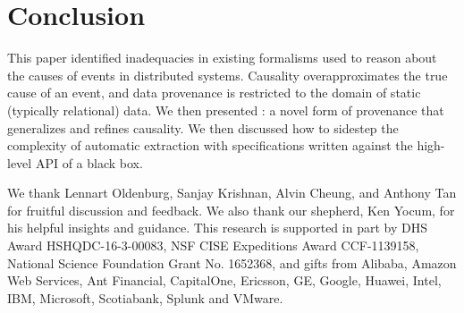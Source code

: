 \section{Conclusion}
This paper identified inadequacies in existing formalisms used to reason about
the causes of events in distributed systems. Causality overapproximates the
true cause of an event, and data provenance is restricted to the domain of
static (typically relational) data. We then presented \watprovenance{}: a novel
form of provenance that generalizes \whyprovenance{} and refines causality. We
then discussed how to sidestep the complexity of automatic \watprovenance{}
extraction with \watprovenance{} specifications written against the high-level
API of a black box.

\begin{acks}
  We thank Lennart Oldenburg, Sanjay Krishnan, Alvin Cheung, and Anthony Tan
  for fruitful discussion and feedback. We also thank our shepherd, Ken Yocum,
  for his helpful insights and guidance.
  This research is supported in part by DHS Award HSHQDC-16-3-00083, NSF CISE
  Expeditions Award CCF-1139158, National Science Foundation Grant No. 1652368,
  and gifts from Alibaba, Amazon Web Services, Ant Financial, CapitalOne,
  Ericsson, GE, Google, Huawei, Intel, IBM, Microsoft, Scotiabank, Splunk and
  VMware.
\end{acks}
